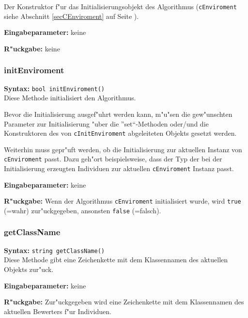 Der Konstruktor f"ur das Initialisierungsobjekt des Algorithmus (\verb|cEnviroment| siehe Abschnitt \ref{secCEnviroment} auf Seite \pageref{secCEnviroment}).

\bigskip\noindent
\textbf{Eingabeparameter:} keine

\bigskip\noindent
\textbf{R"uckgabe:} keine


\subsubsection{initEnviroment}

\textbf{Syntax:} \verb|bool initEnviroment()| \\

Diese Methode initialisiert den Algorithmus.

Bevor die Initialisierung ausgef"uhrt werden kann, m"u"sen die gew"unschten Parameter zur Initialisierung "uber die ''set``-Methoden oder/und die Konstruktoren des von \verb|cInitEnviroment| abgeleiteten Objekts gesetzt werden.

Weiterhin muss gepr"uft werden, ob die Initialisierung zur aktuellen Instanz von \verb|cEnviroment| passt. Dazu geh"ort beispielsweise, dass der Typ der bei der Initialisierung erzeugten Individuen zur aktuellen \verb|cEnviroment| Instanz passt.

\bigskip\noindent
\textbf{Eingabeparameter:} keine

\bigskip\noindent
\textbf{R"uckgabe:} Wenn der Algorithmus \verb|cEnviroment| initialisiert wurde, wird \verb|true| (=wahr) zur"uckgegeben, ansonsten \verb|false| (=falsch).


\subsubsection{getClassName}

\textbf{Syntax:} \verb|string getClassName()| \\

Diese Methode gibt eine Zeichenkette mit dem Klassennamen des aktuellen Objekts zur"uck.

\bigskip\noindent
\textbf{Eingabeparameter:} keine

\bigskip\noindent
\textbf{R"uckgabe:} Zur"uckgegeben wird eine Zeichenkette mit dem Klassennamen des aktuellen Bewerters f"ur Individuen.



